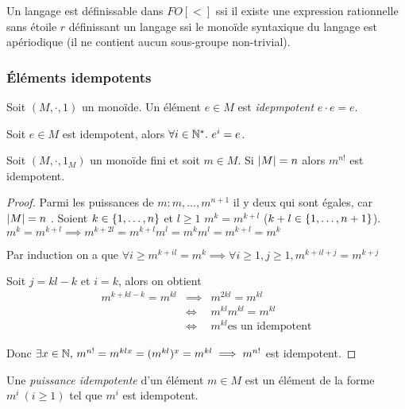 


\begin{theorem}
	Un langage est définissable dans $FO[<]$ ssi il existe une expression rationnelle sans étoile $r$ définissant un langage
	ssi
	le monoïde syntaxique du langage est apériodique (\cad il ne contient aucun sous-groupe non-trivial).
\end{theorem}

\subsubsection{Éléments idempotents}

\begin{definition}
	Soit $(M,\cdot , 1)$ un monoïde. Un élément $e \in M$ est \emph{idepmpotent} \ssi $e \cdot e = e$.
\end{definition}

\begin{exercice} \label{ex:puiss-idemp}
	Soit $e \in M$ est idempotent, alors $\forall i \in \N^*. \ e^i = e$.
\end{exercice}

\begin{lemma}
	Soit $(M,\cdot , 1_M)$ un monoïde fini et soit $m \in M$. Si $\left|M\right| = n$ alors $m^{n!}$ est idempotent.
\end{lemma}

\begin{proof}
	Parmi les puissances de $m : m, \ldots , m^{n+1}$ il y  deux qui sont égales, car $\left|M\right| = n$ .
	Soient $k \in \left\{1,\ldots,n\right\}$ et $l \geq 1$ \tq $m ^{k} = m ^{k+l}$ ($k + l \in \left\{1,\ldots,n+1\right\}$).
	$m ^{k} = m ^{k+l} \implies m ^{k+2l} = m ^{k+l} m^l = m^k m^l = m^{k+l} = m^k$

	Par induction on a que $\forall i \geq m^{k+il} = m^{k} \implies \forall i \geq 1, j \geq 1, m^{k+il+ j} = m^{k +j}$

	Soit $j = kl - k$ et $i =k$, alors on obtient
	\begin{eqnarray*}
		m ^{k + kl - k} = m^{kl} &\implies& m^{2kl} = m^{kl} \\
		&\iff& m^{kl}  m^{kl} = m^{kl} \\
		&\iff& m^{kl} \text{es un idempotent}
	\end{eqnarray*}

	Donc $\exists x \in \mathbb{N}, \, m^{n!} = m^{klx} = (m^{kl})^x = m^{kl} \implies m^{n!}$ est idempotent.
\end{proof}


\begin{definition}
	Une \emph{puissance idempotente} d'un élément $m \in M$ est un élément de la forme $m^i \ (i\geq 1)$ tel que $m^i$ est idempotent.
\end{definition}

